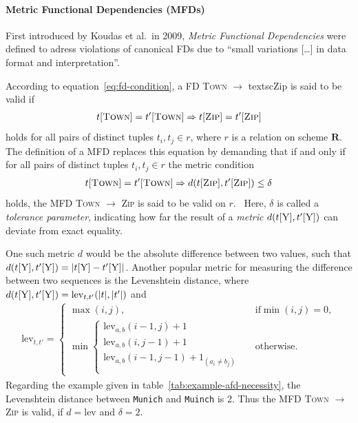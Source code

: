 \paragraph{Metric Functional Dependencies (MFDs)}
First introduced by Koudas et al.\ in 2009, \emph{Metric Functional Dependencies} were defined to adress violations of canonical FDs due to ``small variations [\dots] in data format and interpretation''.~\cite[p.~1]{KOU09}

According to equation~\ref{eq:fd-condition}, a FD \textsc{Town} \( \to\) textsc{Zip} is said to be valid if
\begin{align}
    t[\textsc{Town}] = t'[\textsc{Town}] \Rightarrow t[\textsc{Zip}] = t'[\textsc{Zip}]
\end{align}
holds for all pairs of distinct tuples \( t_i, t_j \in r \), where \( r \) is a relation on scheme \( \boldsymbol{R} \).
The definition of a MFD replaces this equation by demanding that if and only if for all pairs of distinct tuples \( t_i, t_j \in r \) the metric condition
\begin{align}\label{eq:mfd-condition}
    t[\textsc{Town}] = t'[\textsc{Town}] \Rightarrow d(t[\textsc{Zip}], t'[\textsc{Zip}]) \leq \delta
\end{align}
holds, the MFD \textsc{Town} \( \to\) \textsc{Zip} is said to be valid on \( r \).~\cite[p.~2]{KOU09}
Here, \( \delta \) is called a \emph{tolerance parameter}, indicating how far the result of a \emph{metric} \( d(t[\textsc{Y}], t'[\textsc{Y}]) \) can deviate from exact equality.

One such metric \( d \) would be the absolute difference between two values, such that \( d(t[\textsc{Y}], t'[\textsc{Y}]) = | t[\textsc{Y}] - t'[\textsc{Y}]| \).
Another popular metric for measuring the difference between two sequences is the Levenshtein distance, where \( d(t[\textsc{Y}], t'[\textsc{Y}]) = \text{lev}_{t,t'}(|t|, |t'|) \) and
\begin{align*}
    \text{lev}_{t,t'} =
    \begin{cases}
        \max(i,j),  & \text{if} \min(i,j)=0, \\
        \min \begin{cases}
            \text{lev}_{a, b}(i-1, j)+1 & \\
            \text{lev}_{a, b}(i, j-1)+1 & \\
            \text{lev}_{a, b}(i-1, j-1)+1_{(a_i \neq b_j)} \\
        \end{cases} & \text{otherwise.}
    \end{cases}
\end{align*}
Regarding the example given in table~\ref{tab:example-afd-necessity}, the Levenshtein distance between \texttt{Munich} and \texttt{Muinch} is 2.
Thus the MFD \textsc{Town} \( \to\) \textsc{Zip} is valid, if \( d = \text{lev} \) and \( \delta = 2 \).


